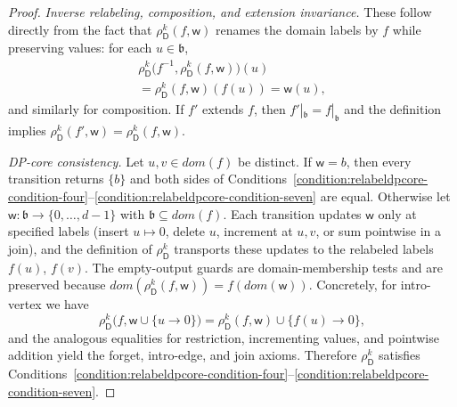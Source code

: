 \documentclass[11pt,a4paper]{article}
\newcommand{\treewidthvalue}{k}
\newcommand{\abag}{\mathfrak{b}}
\newcommand{\vertexone}{u}
\newcommand{\vertextwo}{v}
\newcommand{\awitness}{\mathsf{w}}
\newcommand{\dpcore}{\mathsf{D}}
\newcommand{\domain}{dom}
\newcommand{\maxdegreeparameter}{d}
\newcommand{\maxdegreefound}{b}
\newcommand{\relabelingfunction}{f}
\newcommand{\action}{\rho}
\begin{document}
{\begin{proof}
\smallskip\noindent
\emph{Inverse relabeling, composition, and extension invariance.}
These follow directly from the fact that $\action_{\dpcore}^{\treewidthvalue}(\relabelingfunction,\awitness)$ renames the domain labels by $\relabelingfunction$ while preserving values: for each $u\in \abag$,
\begin{multline*}
\action_{\dpcore}^{\treewidthvalue}\!\bigl(\relabelingfunction^{-1},\action_{\dpcore}^{\treewidthvalue}(\relabelingfunction,\awitness)\bigr)(u)\\
=\action_{\dpcore}^{\treewidthvalue}(\relabelingfunction,\awitness)(\relabelingfunction(u))
=\awitness(u),
\end{multline*}
and similarly for composition. If $\relabelingfunction'$ extends $\relabelingfunction$, then $\relabelingfunction'|_{\abag}=\relabelingfunction|_{\abag}$ and the definition implies $\action_{\dpcore}^{\treewidthvalue}(\relabelingfunction',\awitness)=\action_{\dpcore}^{\treewidthvalue}(\relabelingfunction,\awitness)$.

\smallskip\noindent
\emph{DP-core consistency.}
Let $\vertexone,\vertextwo\in \domain(\relabelingfunction)$ be distinct. If $\awitness=\maxdegreefound$, then every transition returns $\{\maxdegreefound\}$ and both sides of Conditions~\ref{condition:relabeldpcore-condition-four}--\ref{condition:relabeldpcore-condition-seven} are equal.
Otherwise let $\awitness:\abag\to\{0,\dots,\maxdegreeparameter-1\}$ with $\abag\subseteq \domain(\relabelingfunction)$.
Each transition updates $\awitness$ only at specified labels (insert $\vertexone\mapsto 0$, delete $\vertexone$, increment at $\vertexone,\vertextwo$, or sum pointwise in a join), and the definition of $\action_{\dpcore}^{\treewidthvalue}$ transports these updates to the relabeled labels $\relabelingfunction(\vertexone)$, $\relabelingfunction(\vertextwo)$. The empty-output guards are domain-membership tests and are preserved because $\domain(\action_{\dpcore}^{\treewidthvalue}(\relabelingfunction,\awitness))=\relabelingfunction(\domain(\awitness))$.
Concretely, for intro-vertex we have
\[
\action_{\dpcore}^{\treewidthvalue}\!\bigl(\relabelingfunction,\awitness\cup\{\vertexone\to 0\}\bigr)
=\action_{\dpcore}^{\treewidthvalue}(\relabelingfunction,\awitness)\cup\{\relabelingfunction(\vertexone)\to 0\},
\]
and the analogous equalities for restriction, incrementing values, and pointwise addition yield the forget, intro-edge, and join axioms.
Therefore $\action_{\dpcore}^{\treewidthvalue}$ satisfies Conditions~\ref{condition:relabeldpcore-condition-four}--\ref{condition:relabeldpcore-condition-seven}.
\end{proof}

}
\end{document}
